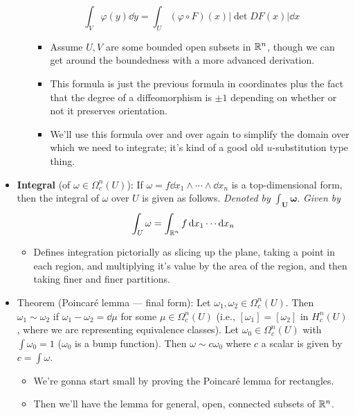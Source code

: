 \documentclass[../notes.tex]{subfiles}
\begin{document}
\begin{itemize}
\begin{itemize}
        \begin{equation*}
            \int_V\varphi(y)\dd{y} = \int_U(\varphi\circ F)(x)|\det DF(x)|\dd{x}
        \end{equation*}
        \begin{itemize}
            \item Assume $U,V$ are some bounded open subsets in $\mathbb{R}^n$, though we can get around the boundedness with a more advanced derivation.
            \item This formula is just the previous formula in coordinates plus the fact that the degree of a diffeomorphism is $\pm 1$ depending on whether or not it preserves orientation.
            \item We'll use this formula over and over again to simplify the domain over which we need to integrate; it's kind of a good old $u$-substitution type thing.
        \end{itemize}
    \end{itemize}
    \item \textbf{Integral} (of $\omega\in\Omega_c^n(U)$): If $\omega=f\dd{x_1}\wedge\cdots\wedge\dd{x_n}$ is a top-dimensional form, then the integral of $\omega$ over $U$ is given as follows. \emph{Denoted by} $\bm{\int_U\omega}$. \emph{Given by}
    \begin{equation*}
        \int_U\omega = \int_{\mathbb{R}^n}f\dd{x_1}\cdots\dd{x_n}
    \end{equation*}
    \begin{itemize}
        \item Defines integration pictorially as slicing up the plane, taking a point in each region, and multiplying it's value by the area of the region, and then taking finer and finer partitions.
    \end{itemize}
    \item Theorem (Poincar\'{e} lemma --- final form): Let $\omega_1,\omega_2\in\Omega_c^n(U)$. Then $\omega_1\sim\omega_2$ if $\omega_1-\omega_2=\dd{\mu}$ for some $\mu\in\Omega_c^n(U)$ (i.e., $[\omega_1]=[\omega_2]$ in $H_c^n(U)$, where we are representing equivalence classes). Let $\omega_0\in\Omega_c^n(U)$ with $\int\omega_0=1$ ($\omega_0$ is a bump function). Then $\omega\sim c\omega_0$ where $c$ a scalar is given by $c=\int\omega$.
    \begin{itemize}
        \item We're gonna start small by proving the Poincar\'{e} lemma for rectangles.
        \item Then we'll have the lemma for general, open, connected subsets of $\mathbb{R}^n$.

\end{itemize}
\end{itemize}
\end{document}
